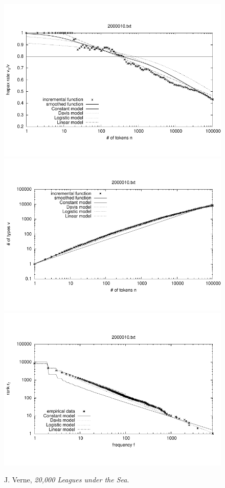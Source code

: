 \documentclass[a4paper,12pt]{article}
\begin{document}

\begin{figure}[p]
  \centering
  \vspace{-2em}
  \includegraphics[width=0.8\columnwidth]{output/herdan/2000010_27/token_ratio.pdf}
  \\[-3em]
  \includegraphics[width=0.8\columnwidth]{output/herdan/2000010_27/token_type.pdf}
  \\[-3em]
  \includegraphics[width=0.8\columnwidth]{output/herdan/2000010_27/frequency_rank.pdf}
  \vspace{-2em}
  \caption{J. Verne, \emph{20,000 Leagues under the Sea}.\label{fig2000010F}}
\end{figure}
\end{document}

